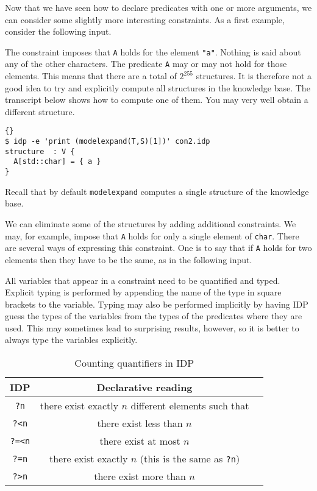 \documentclass{article}
\newcommand{\idp}{{\sc IDP}\xspace}
\newcommand{\code}[1]{\texttt{#1}}
\begin{document}
Now that we have seen how to declare predicates with one or more
arguments, we can consider some slightly more interesting constraints.
As a first example, consider the following input.

The constraint imposes that \texttt{A} holds for the element \lstinline!"a"!.
Nothing is said about any of the other characters.
The predicate \texttt{A} may or may not hold for those elements.
This means that there are a total of $2^{255}$ structures.
It is therefore not a good idea to try and explicitly compute
all structures in the knowledge base.
The transcript below shows how to compute one of
them.  You may very well obtain a different structure.
\begin{lstlisting}{}
$ idp -e 'print (modelexpand(T,S)[1])' con2.idp 
structure  : V {
  A[std::char] = { a }
}

\end{lstlisting}
Recall that by default \texttt{modelexpand} computes a single structure
of the knowledge base.

We can eliminate some of the structures by adding additional constraints.
We may, for example, impose that \texttt{A} holds for only a single
element of \texttt{char}.  There are several ways of expressing
this constraint.  One is to say that if \texttt{A} holds for two elements
then they have to be the same, as in the following input.

All variables that appear in a constraint need to be quantified and typed.
Explicit typing is performed by appending the name of the type in square
brackets to the variable.  Typing may also be performed implicitly by
having \idp guess the types of the variables from the types of the predicates
where they are used.  This may sometimes lead to surprising results, however,
so it is better to always type the variables explicitly.

\begin{table}
\begin{center}
\begin{tabular}{c|c|l}
\idp & Declarative reading \\
\hline
\code{?n}  & there exist exactly $n$ different elements such that \\
\code{?<n} & there exist less than $n$ \\
\code{?=<n} & there exist at most $n$\\
\code{?=n} & there exist exactly $n$ (this is the same as \code{?n})\\
\code{?>n} & there exist more than $n$
\end{tabular}
\end{center}
\caption{Counting quantifiers in \idp}
\label{t:counting}
\end{table}
\end{document}
